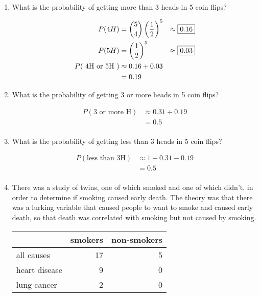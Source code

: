 \documentclass[letterpaper, landscape]{exam}
\begin{document}
\begin{enumerate}
    \item What is the probability of getting more than 3 heads in 5 coin flips?
      \begin{solution}
        \begin{align*}
          P( 4H )                & = \binom{5}{4} \del{ \frac{1}{2} }^5
                                 & \approx \boxed{ 0.16 } \\
          P( 5H )                & = \del{ \frac{1}{2} }^5
                                 & \approx \boxed{ 0.03 } \\
          P( \text{ 4H or 5H } ) & \approx 0.16 + 0.03 \\
                                 & = 0.19 \\
        \end{align*}
      \end{solution}

    \item What is the probability of getting 3 or more heads in 5 coin flips?
      \begin{solution}
        \begin{align*}
          P( \text{3 or more H} ) & \approx 0.31 + 0.19 \\
                                   & = 0.5 \\
        \end{align*}
      \end{solution}

    \item What is the probability of getting less than 3 heads in 5 coin flips?
      \begin{solution}
        \begin{align*}
          P( \text{less than 3H} ) & \approx 1 - 0.31 - 0.19 \\
                                   & = 0.5 \\
        \end{align*}
      \end{solution}

    \item There was a study of twins, one of which smoked and one of which
      didn't, in order to determine if smoking caused early death. The theory
      was that there was a lurking variable that caused people to want to smoke
      and caused early death, so that death was correlated with smoking but not
      caused by smoking.

      \begin{tabular}[H]{lrr}
        \toprule
                      & smokers & non-smokers \\
        \midrule
        all causes    & 17      & 5 \\
        heart disease & 9       & 0 \\
        lung cancer   & 2       & 0 \\
        \bottomrule
      \end{tabular}


\end{enumerate}
\end{document}
